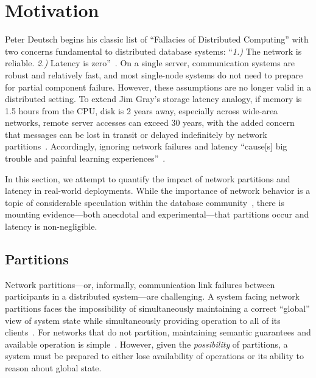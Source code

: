 
\section{Motivation}
\label{sec:motivation}

Peter Deutsch begins his classic list of ``Fallacies of Distributed
Computing'' with two concerns fundamental to distributed database
systems: ``\textit{1.)}  The network is reliable. \textit{2.)} Latency
is zero''~\cite{fallacies-deutsch}. On a single server, communication
systems are robust and relatively fast, and most single-node systems
do not need to prepare for partial component failure. However, these
assumptions are no longer valid in a distributed setting. To extend
Jim Gray's storage latency analogy, if memory is 1.5 hours from the
CPU, disk is 2 years away, especially across wide-area networks,
remote server accesses can exceed 30 years, with the added concern
that messages can be lost in transit or delayed indefinitely by
network partitions~\cite{gray-rules}. Accordingly, ignoring network
failures and latency ``cause[s] big trouble and painful learning
experiences''~\cite{fallacies-deutsch}.

In this section, we attempt to quantify the impact of network
partitions and latency in real-world deployments. While the importance
of network behavior is a topic of considerable speculation within the
database community~\cite{stonebraker2010errors}, there is mounting
evidence---both anecdotal and experimental---that partitions occur and
latency is non-negligible.

\subsection{Partitions}

Network partitions---or, informally, communication link failures
between participants in a distributed system---are challenging. A
system facing network partitions faces the impossibility of
simultaneously maintaining a correct ``global'' view of system state
while simultaneously providing operation to all of its
clients~\cite{davidson-survey}. For networks that do not partition,
maintaining semantic guarantees and available operation is
simple~\cite{stonebraker2010errors}. However, given the
\textit{possibility} of partitions, a system must be prepared to
either lose availability of operations or its ability to reason about
global state.

